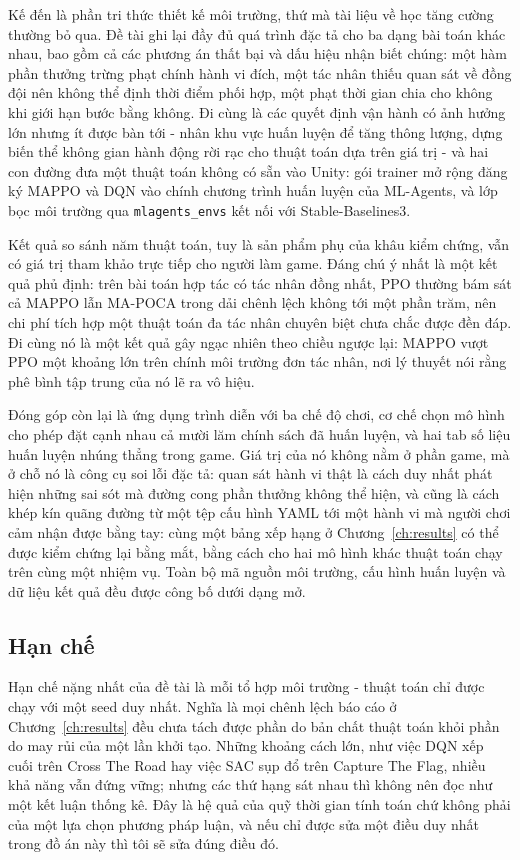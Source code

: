 \indent Kế đến là phần tri thức thiết kế môi trường, thứ mà tài liệu về học tăng cường
thường bỏ qua. Đề tài ghi lại đầy đủ quá trình đặc tả cho ba dạng bài toán khác nhau,
bao gồm cả các phương án thất bại và dấu hiệu nhận biết chúng: một hàm phần thưởng
trừng phạt chính hành vi đích, một tác nhân thiếu quan sát về đồng đội nên không thể
định thời điểm phối hợp, một phạt thời gian chia cho không khi giới hạn bước bằng không.
Đi cùng là các quyết định vận hành có ảnh hưởng lớn nhưng ít được bàn tới - nhân khu vực
huấn luyện để tăng thông lượng, dựng biến thể không gian hành động rời rạc cho thuật
toán dựa trên giá trị - và hai con đường đưa một thuật toán không có sẵn vào Unity: gói
trainer mở rộng đăng ký MAPPO và DQN vào chính chương trình huấn luyện của ML-Agents, và
lớp bọc môi trường qua \texttt{mlagents\_envs} kết nối với Stable-Baselines3.

\indent Kết quả so sánh năm thuật toán, tuy là sản phẩm phụ của khâu kiểm chứng, vẫn có
giá trị tham khảo trực tiếp cho người làm game. Đáng chú ý nhất là một kết quả phủ định:
trên bài toán hợp tác có tác nhân đồng nhất, PPO thường bám sát cả MAPPO lẫn MA-POCA
trong dải chênh lệch không tới một phần trăm, nên chi phí tích hợp một thuật toán đa tác
nhân chuyên biệt chưa chắc được đền đáp. Đi cùng nó là một kết quả gây ngạc nhiên theo
chiều ngược lại: MAPPO vượt PPO một khoảng lớn trên chính môi trường đơn tác nhân, nơi
lý thuyết nói rằng phê bình tập trung của nó lẽ ra vô hiệu.

\indent Đóng góp còn lại là ứng dụng trình diễn với ba chế độ chơi, cơ chế chọn mô hình
cho phép đặt cạnh nhau cả mười lăm chính sách đã huấn luyện, và hai tab số liệu huấn
luyện nhúng thẳng trong game. Giá trị của nó không nằm
ở phần game, mà ở chỗ nó là công cụ soi lỗi đặc tả: quan sát hành vi thật là cách duy
nhất phát hiện những sai sót mà đường cong phần thưởng không thể hiện, và cũng là cách
khép kín quãng đường từ một tệp cấu hình YAML tới một hành vi
mà người chơi cảm nhận được bằng tay: cùng một bảng xếp hạng ở Chương~\ref{ch:results}
có thể được kiểm chứng lại bằng mắt, bằng cách cho hai mô hình khác thuật toán chạy
trên cùng một nhiệm vụ. Toàn bộ mã nguồn môi trường, cấu hình
huấn luyện và dữ liệu kết quả đều được công bố dưới dạng mở.

\subsection{Hạn chế}
\label{sub:limits}
\indent Hạn chế nặng nhất của đề tài là mỗi tổ hợp môi trường - thuật toán chỉ được chạy
với một seed duy nhất. Nghĩa là mọi chênh lệch báo cáo ở Chương~\ref{ch:results} đều
chưa tách được phần do bản chất thuật toán khỏi phần do may rủi của một lần khởi tạo.
Những khoảng cách lớn, như việc DQN xếp cuối trên Cross The Road hay việc SAC sụp đổ
trên Capture The Flag, nhiều khả năng vẫn đứng vững; nhưng các thứ hạng sát nhau thì
không nên đọc như
một kết luận thống kê. Đây là hệ quả của quỹ thời gian tính toán chứ không phải của một
lựa chọn phương pháp luận, và nếu chỉ được sửa một điều duy nhất trong đồ án này thì tôi
sẽ sửa đúng điều đó.

